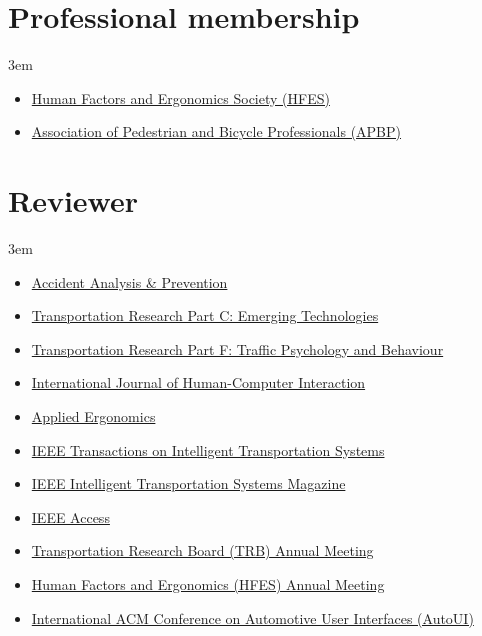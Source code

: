 \documentclass[11pt]{article}
\newenvironment{main}
{\begin{adjustwidth}{3em}{}}
{\end{adjustwidth}}
\begin{document}
\section*{Professional membership}
\begin{main}

\begin{itemize}
    \item \href{https://www.hfes.org/}{Human Factors and Ergonomics Society (HFES)}
    \item \href{https://www.apbp.org/}{Association of Pedestrian and Bicycle Professionals (APBP)}
\end{itemize}


\end{main}
\section*{Reviewer}
\begin{main}

\begin{itemize}
    \item \href{https://www.journals.elsevier.com/accident-analysis-and-prevention}{Accident Analysis \& Prevention}
    \item \href{https://www.journals.elsevier.com/transportation-research-part-c-emerging-technologies}{Transportation Research Part C: Emerging Technologies}
    \item \href{https://www.journals.elsevier.com/transportation-research-part-f-traffic-psychology-and-behaviour}{Transportation Research Part F: Traffic Psychology and Behaviour}
    \item \href{https://www.tandfonline.com/toc/hihc20/current}{International Journal of Human-Computer Interaction}
    \item \href{https://www.journals.elsevier.com/applied-ergonomics}{Applied Ergonomics}
    \item \href{https://ieeexplore.ieee.org/xpl/RecentIssue.jsp?punumber=6979}{IEEE Transactions on Intelligent Transportation Systems}
    \item \href{https://ieeexplore.ieee.org/xpl/RecentIssue.jsp?punumber=5117645}{IEEE Intelligent Transportation Systems Magazine}
    \item \href{https://ieeexplore.ieee.org/xpl/RecentIssue.jsp?punumber=6287639}{IEEE Access}
    \item \href{http://www.trb.org/AnnualMeeting/}{Transportation Research Board (TRB) Annual Meeting}
    \item \href{www.hfes.org}{Human Factors and Ergonomics (HFES) Annual Meeting}
    \item \href{www.auto-ui.org}{International ACM Conference on Automotive User Interfaces (AutoUI)}
\end{itemize}


\end{main}
\end{document}
